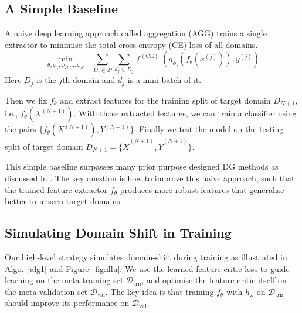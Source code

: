 \documentclass{article}
\begin{document}
\subsection{A Simple Baseline}

A naive deep learning approach called aggregation (AGG) trains a single extractor to minimise the total  cross-entropy (CE) loss of all domains. 
\begin{equation}\label{eq:basic}
\underset{\theta,\phi_1,\phi_2,\dots,\phi_N}{\operatorname{min}}~~~ \sum_{D_j\in \mathcal{D}}\sum_{d_j\in D_j}\ell^{(\text{CE})}(g_{\phi_j}(f_\theta(x^{(j)})), y^{(j)})
\end{equation}
Here $D_j$ is the $j$th domain and $d_j$ is a mini-batch of it. 

Then we fix $f_\theta$ and extract features for the training split of target domain $D_{N+1}$, i.e., $f_\theta(X^{(N+1)})$. With those extracted features, we can train a classifier using the pairs $\{f_\theta(X^{(N+1)}), Y^{(N+1)}\}$. Finally we test the model on the testing split of target domain $\tilde{D}_{N+1}=\{\tilde{X}^{(N+1)}, \tilde{Y}^{(N+1)}\}$.

This simple baseline surpasses many prior purpose designed DG methods as discussed in \citet{Lida17}. The key question is how to improve this naive approach, such that the trained feature extractor $f_\theta$  produces more robust features that generalise better to unseen target domains.

\subsection{Simulating Domain Shift in Training}

Our high-level strategy simulates domain-shift during training  as  illustrated in Algo.~\ref{alg1}  and Figure~\ref{fig:illu}. We use the learned feature-critic loss to guide learning on the meta-training set $\mathcal{D}_\text{trn}$, and optimise the feature-critic itself on the meta-validation set $\mathcal{D}_\text{val}$. The key idea is that training $f_\theta$ with $h_\omega$ on $\mathcal{D}_\text{trn}$ should improve its performance on $\mathcal{D}_\text{val}$.
\end{document}
